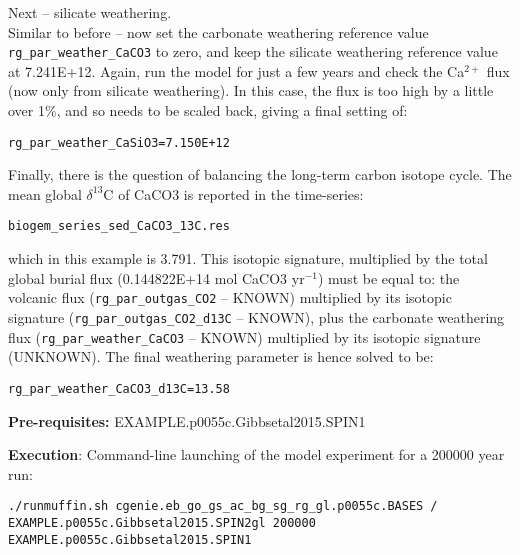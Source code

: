 \documentclass[10pt,twoside]{article}
\begin{document}
\begin{compactenum}
                \item Next -- silicate weathering.
                \\ Similar to before -- now set the carbonate weathering reference value  \texttt{rg\_par\_weather\_CaCO3} to zero, and keep the silicate weathering reference value at 7.241E+12.
                Again, run the model for just a few years and check the Ca$^{2+}$ flux (now only from silicate weathering).
                In this case, the flux is too high by a little over 1\%, and so needs to be scaled back, giving a final setting of: 
\vspace{-5pt}\begin{verbatim}
rg_par_weather_CaSiO3=7.150E+12
                \end{verbatim}\vspace{-5pt}
                
                \item Finally, there is the question of balancing the long-term carbon isotope cycle.
                The mean global $\delta^{13}$C of CaCO3 is reported in the time-series:
\vspace{-5pt}\begin{verbatim}
biogem_series_sed_CaCO3_13C.res
\end{verbatim}\vspace{-5pt}
which in this example is 3.791.
This isotopic signature, multiplied by the total global burial flux (0.144822E+14 mol CaCO3 yr$^{-1}$) must be equal to: the volcanic flux (\texttt{rg\_par\_outgas\_CO2} -- KNOWN) multiplied by its isotopic signature (\texttt{rg\_par\_outgas\_CO2\_d13C} -- KNOWN), plus the carbonate weathering flux (\texttt{rg\_par\_weather\_CaCO3} -- KNOWN) multiplied by its isotopic signature (UNKNOWN). The final weathering parameter is hence solved to be:
\vspace{-5pt}\begin{verbatim}
rg_par_weather_CaCO3_d13C=13.58
\end{verbatim}\vspace{-5pt}

\end{compactenum}

\noindent \textbf{Pre-requisites:} EXAMPLE.p0055c.Gibbsetal2015.SPIN1

\noindent \textbf{Execution}: Command-line launching of the model experiment for a 200000 year run:
\vspace{-10pt}\small\begin{verbatim}
./runmuffin.sh cgenie.eb_go_gs_ac_bg_sg_rg_gl.p0055c.BASES / 
EXAMPLE.p0055c.Gibbsetal2015.SPIN2gl 200000 
EXAMPLE.p0055c.Gibbsetal2015.SPIN1 
\end{verbatim}\normalsize\vspace{-10pt}
\end{document}
